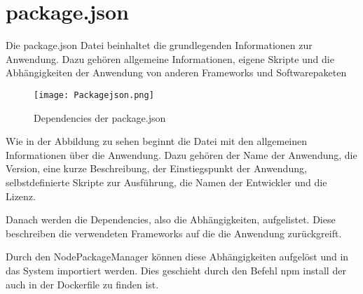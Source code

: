 
\chapter{package.json}
\label{ch:package.json}
Die package.json Datei beinhaltet die grundlegenden Informationen zur Anwendung. Dazu gehören allgemeine Informationen, eigene Skripte und die Abhängigkeiten der Anwendung von anderen Frameworks und Softwarepaketen

\begin{wrapfigure}{r}{0\textwidth}
\centering
\texttt{[image: Packagejson.png]}
\vspace{4pt}
\caption{Dependencies der package.json}
\label{fig:Dependencies der package.json}
\end{wrapfigure}

Wie in der Abbildung zu sehen beginnt die Datei mit den allgemeinen Informationen über die Anwendung. Dazu gehören der Name der Anwendung, die Version, eine kurze Beschreibung, der Einstiegspunkt der Anwendung, selbstdefinierte Skripte zur Ausführung, die Namen der Entwickler und die Lizenz.

Danach werden die Dependencies, also die Abhängigkeiten, aufgelistet. Diese beschreiben die verwendeten Frameworks auf die die Anwendung zurückgreift.

Durch den \glqq NodePackageManager\grqq{} können diese Abhängigkeiten aufgelöst und in das System importiert werden. Dies geschieht durch den Befehl npm install der auch in der Dockerfile zu finden ist.